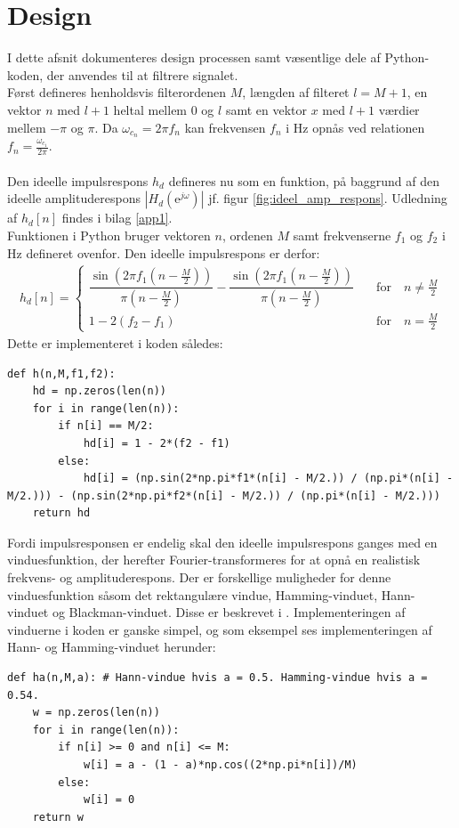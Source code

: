 \section{Design} \label{ch4_design}
I dette afsnit dokumenteres design processen samt væsentlige dele af Python-koden, der anvendes til at filtrere signalet.\\
Først defineres henholdsvis filterordenen $M$, længden af filteret $l = M + 1$, en vektor $n$ med $l+1$ heltal mellem 0 og $l$ samt en vektor $x$ med $l+1$ værdier mellem $-\pi$ og $\pi$. Da $\omega_{c_n} = 2\pi f_n$ kan frekvensen $f_n$ i Hz opnås ved relationen $f_n = \frac{\omega_{c_1}}{2\pi}$. \\
\\
Den ideelle impulsrespons $h_d$ defineres nu som en funktion, på baggrund af den ideelle amplituderespons $|H_d(\text{e}^{j\omega})|$ jf. figur \ref{fig:ideel_amp_respons}. Udledning af $h_d[n]$ findes i bilag \ref{app1}. \\
Funktionen i Python bruger vektoren $n$, ordenen $M$ samt frekvenserne $f_1$ og $f_2$ i Hz defineret ovenfor. Den ideelle impulsrespons er derfor:
\begin{align*}
h_d[n] = \begin{cases} \dfrac{\sin\left(2 \pi f_1\left(n - \frac{M}{2}\right)\right)}{\pi\left(n - \frac{M}{2}\right)} - \dfrac{\sin\left(2\pi f_1\left(n - \frac{M}{2}\right)\right)}{\pi\left(n - \frac{M}{2}\right)} \quad &\text{for} \quad n \neq \frac{M}{2} \\
1 - 2(f_2 - f_1) \quad &\text{for} \quad n = \frac{M}{2}
\end{cases}
\end{align*}
Dette er implementeret i koden således:
\begin{lstlisting}
def h(n,M,f1,f2):
    hd = np.zeros(len(n))
    for i in range(len(n)):
        if n[i] == M/2:
            hd[i] = 1 - 2*(f2 - f1)
        else:
            hd[i] = (np.sin(2*np.pi*f1*(n[i] - M/2.)) / (np.pi*(n[i] - M/2.))) - (np.sin(2*np.pi*f2*(n[i] - M/2.)) / (np.pi*(n[i] - M/2.)))
    return hd
\end{lstlisting}
Fordi impulsresponsen er endelig skal den ideelle impulsrespons ganges med en vinduesfunktion, der herefter Fourier-transformeres for at opnå en realistisk frekvens- og amplituderespons. Der er forskellige muligheder for denne vinduesfunktion såsom det rektangulære vindue, Hamming-vinduet, Hann-vinduet og Blackman-vinduet. Disse er beskrevet i \cite{side 558-559, DTSP}. Implementeringen af vinduerne i koden er ganske simpel, og som eksempel ses implementeringen af Hann- og Hamming-vinduet herunder:
\begin{lstlisting}
def ha(n,M,a): # Hann-vindue hvis a = 0.5. Hamming-vindue hvis a = 0.54.
    w = np.zeros(len(n))
    for i in range(len(n)):
        if n[i] >= 0 and n[i] <= M:
            w[i] = a - (1 - a)*np.cos((2*np.pi*n[i])/M)
        else:
            w[i] = 0
    return w
\end{lstlisting}

